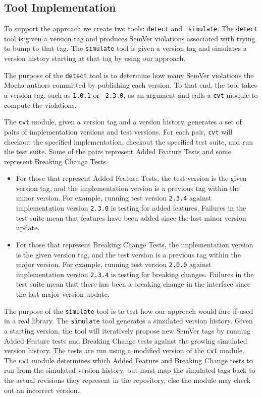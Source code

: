 \subsection{Tool Implementation}
To support the approach we create two tools: {\tt detect} and {\tt
  simulate}. The {\tt detect} tool is given a version tag and
produces SemVer violations associated with trying to bump to that
tag. The {\tt simulate} tool is given a version tag and simulates a
version history starting at that tag by using our approach.

The purpose of the {\tt detect} tool is to determine how many SemVer
violations the Mocha authors committed by publishing each version. To
that end, the tool takes a version tag, such as {\tt 1.0.1} or {\tt
  2.3.0}, as an argument and calls a {\tt cvt} module to compute the
violations.

The {\tt cvt} module, given a version tag and a version history,
generates a set of pairs of implementation versions and test
versions. For each pair, {\tt cvt} will checkout the specified
implementation, checkout the specified test suite, and run the test
suite. Some of the pairs represent Added Feature Tests and some
represent Breaking Change Tests.

\begin{itemize}
\item For those that represent Added Feature Tests, the test version
  is the given version tag, and the implementation version is a
  previous tag within the minor version. For example, running test
  version {\tt 2.3.4} against implementation version {\tt 2.3.0} is
  testing for added features. Failures in the test suite mean that
  features have been added since the last minor version update.
\item For those that represent Breaking Change Tests, the
  implementation version is the given version tag, and the test
  version is a previous tag within the major version. For example,
  running test version {\tt 2.0.0} against implementation version
  {\tt 2.3.4} is testing for breaking changes. Failures in the test
  suite mean that there has been a breaking change in the interface
  since the last major version update.
\end{itemize}

The purpose of the {\tt simulate} tool is to test how our approach
would fare if used in a real library. The {\tt simulate} tool
generates a simulated version history. Given a starting version, the
tool will iteratively propose new SemVer tags by running Added
Feature tests and Breaking Change tests against the growing simulated
version history. The tests are run using a modified version of the
{\tt cvt} module. The {\tt cvt} module determines which Added Feature
and Breaking Change tests to run from the simulated version history,
but must map the simulated tags back to the actual revisions they
represent in the repository, else the module may check out an
incorrect version.
